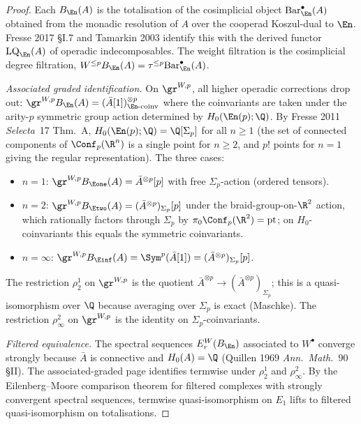 \begin{proof}
Each $B_{\En}(A)$ is the totalisation of the cosimplicial object $\mathrm{Bar}_{\En}^\bullet(A)$ obtained from the monadic resolution of $A$ over the cooperad Koszul-dual to $\En$. Fresse 2017 \S I.7 and Tamarkin 2003 identify this with the derived functor $\mathrm{LQ}_{\En}(A)$ of operadic indecomposables. The weight filtration is the cosimplicial degree filtration, $W^{\le p} B_{\En}(A) = \tau^{\le p} \mathrm{Bar}_{\En}^\bullet(A)$.

\emph{Associated graded identification.} On $\gr^{W,p}$, all higher operadic corrections drop out: $\gr^{W,p} B_{\En}(A) = (\bar A[1])^{\otimes p}_{\En\text{-coinv}}$ where the coinvariants are taken under the arity-$p$ symmetric group action determined by $H_0(\En(p); \Q)$. By Fresse 2011 \emph{Selecta}~17 Thm.~A, $H_0(\En(p); \Q) = \Q[\Sigma_p]$ for all $n \ge 1$ (the set of connected components of $\Conf_p(\R^n)$ is a single point for $n \ge 2$, and $p!$ points for $n = 1$ giving the regular representation). The three cases:
\begin{itemize}
\item $n = 1$: $\gr^{W,p} B_{\Eone}(A) = \bar A^{\otimes p}[p]$ with free $\Sigma_p$-action (ordered tensors).
\item $n = 2$: $\gr^{W,p} B_{\Etwo}(A) = (\bar A^{\otimes p})_{\Sigma_p}[p]$ under the braid-group-on-$\R^2$ action, which rationally factors through $\Sigma_p$ by $\pi_0 \Conf_p(\R^2) = \pt$; on $H_0$-coinvariants this equals the symmetric coinvariants.
\item $n = \infty$: $\gr^{W,p} B_{\Einf}(A) = \Sym^p(\bar A[1]) = (\bar A^{\otimes p})_{\Sigma_p}[p]$.
\end{itemize}
The restriction $\rho_2^1$ on $\gr^{W,p}$ is the quotient $\bar A^{\otimes p} \to (\bar A^{\otimes p})_{\Sigma_p}$; this is a quasi-isomorphism over $\Q$ because averaging over $\Sigma_p$ is exact (Maschke). The restriction $\rho_\infty^2$ on $\gr^{W,p}$ is the identity on $\Sigma_p$-coinvariants.

\emph{Filtered equivalence.} The spectral sequences $E_r^{W}(B_{\En})$ associated to $W^\bullet$ converge strongly because $\bar A$ is connective and $H_0(A) = \Q$ (Quillen 1969 \emph{Ann.\ Math.}~90 \S II). The associated-graded page identifies termwise under $\rho_2^1$ and $\rho_\infty^2$. By the Eilenberg--Moore comparison theorem for filtered complexes with strongly convergent spectral sequences, termwise quasi-isomorphism on $E_1$ lifts to filtered quasi-isomorphism on totalisations.


\end{proof}
